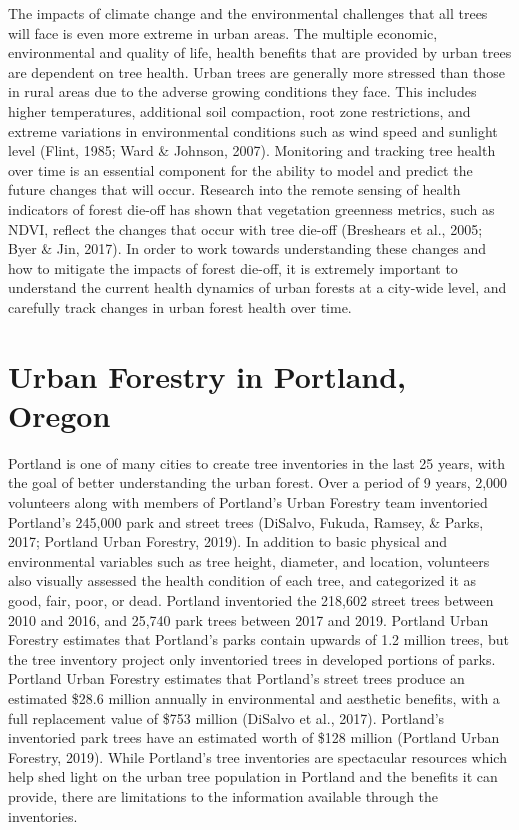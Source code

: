 \documentclass[12pt,twoside]{reedthesis}
\begin{document}
The impacts of climate change and the environmental challenges that all trees will face is even more extreme in urban areas. The multiple economic, environmental and quality of life, health benefits that are provided by urban trees are dependent on tree health. Urban trees are generally more stressed than those in rural areas due to the adverse growing conditions they face. This includes higher temperatures, additional soil compaction, root zone restrictions, and extreme variations in environmental conditions such as wind speed and sunlight level (Flint, 1985; Ward \& Johnson, 2007). Monitoring and tracking tree health over time is an essential component for the ability to model and predict the future changes that will occur. Research into the remote sensing of health indicators of forest die-off has shown that vegetation greenness metrics, such as NDVI, reflect the changes that occur with tree die-off (Breshears et al., 2005; Byer \& Jin, 2017). In order to work towards understanding these changes and how to mitigate the impacts of forest die-off, it is extremely important to understand the current health dynamics of urban forests at a city-wide level, and carefully track changes in urban forest health over time.

\hypertarget{urban-forestry-in-portland-oregon}{%
\section{Urban Forestry in Portland, Oregon}\label{urban-forestry-in-portland-oregon}}

Portland is one of many cities to create tree inventories in the last 25 years, with the goal of better understanding the urban forest. Over a period of 9 years, 2,000 volunteers along with members of Portland's Urban Forestry team inventoried Portland's 245,000 park and street trees (DiSalvo, Fukuda, Ramsey, \& Parks, 2017; Portland Urban Forestry, 2019). In addition to basic physical and environmental variables such as tree height, diameter, and location, volunteers also visually assessed the health condition of each tree, and categorized it as good, fair, poor, or dead. Portland inventoried the 218,602 street trees between 2010 and 2016, and 25,740 park trees between 2017 and 2019. Portland Urban Forestry estimates that Portland's parks contain upwards of 1.2 million trees, but the tree inventory project only inventoried trees in developed portions of parks. Portland Urban Forestry estimates that Portland's street trees produce an estimated \$28.6 million annually in environmental and aesthetic benefits, with a full replacement value of \$753 million (DiSalvo et al., 2017). Portland's inventoried park trees have an estimated worth of \$128 million (Portland Urban Forestry, 2019). While Portland's tree inventories are spectacular resources which help shed light on the urban tree population in Portland and the benefits it can provide, there are limitations to the information available through the inventories.
\end{document}
